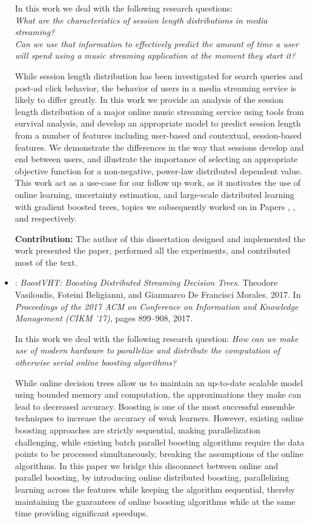 \begin{itemize}
	In this work we deal with the following research questions:\\
	\emph{What are the characteristics of session length distributions in media streaming?\\
	Can we use that information to effectively predict the amount of time a user will spend using
	a music streaming application at the moment they start it?}

	While session length distribution has been investigated for search
	queries and post-ad click behavior, the behavior of users in a media
	streaming service is likely to differ greatly.
	In this work we provide an analysis of the session length distribution
	of a major online music streaming service using tools from survival analysis, and develop an appropriate
	model to predict session length from a number of features including
	user-based and contextual, session-based features.
	We demonstrate the differences in the way that sessions develop and end
	between users, and illustrate the importance of selecting an appropriate
	objective function for a non-negative, power-law distributed dependent value.
	This work act as a use-case for our follow up work, as it motivates the use of online learning,
	uncertainty estimation, and large-scale distributed learning with gradient boosted
	trees, topics we subsequently worked on in Papers \boostvhtNum, \uncertaintreesNum,
	and \blockgbtNum respectively.

	\textbf{Contribution:} The author of this dissertation designed and implemented the work
	presented the paper, performed all the experiments, and contributed most of the
	text.

	\item \textbf{\boostvht}: \emph{BoostVHT: Boosting Distributed Streaming Decision Trees.} Theodore Vasiloudis, Foteini Beligianni, and Gianmarco De Francisci Morales. 2017.  In \emph{Proceedings of the 2017 ACM on Conference on Information and Knowledge Management (CIKM '17)}, pages 899--908, 2017.

	In this work we deal with the following research question:
	\emph{How can we make use of modern hardware to parallelize and distribute
	the computation of otherwise serial online boosting algorithms?}

	While online decision trees allow us to maintain an up-to-date scalable
	model using bounded memory and computation, the approximations they make
	can lead to decreased accuracy.
	Boosting is one of the most successful ensemble techniques to increase the
	accuracy of weak learners. However, existing online boosting approaches
	are strictly sequential, making parallelization challenging, while existing batch parallel boosting algorithms
	require the data points to be processed simultaneously, breaking the assumptions
	of the online algorithms. In this paper we bridge
	this disconnect between online and parallel boosting, by introducing
	online distributed boosting, parallelizing learning
	across the features while keeping the algorithm sequential, thereby maintaining the guarantees of online boosting
	algorithms while at the same time providing significant speedups.


\end{itemize}
